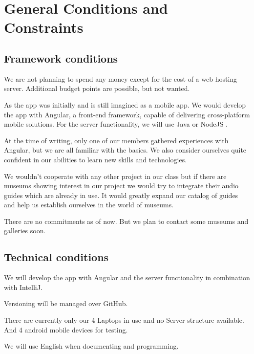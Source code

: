 \documentclass[12pt]{article}
\theoremstyle{definition}
\newenvironment{text}{
}{}
\begin{document}
\pagebreak
 
\section{General Conditions and Constraints}

\subsection{Framework conditions} 
\begin{text}

We are not planning to spend any money except for the cost of a web hosting server. Additional budget points are possible, but not wanted.\newline

As the app was initially and is still imagined as a mobile app. We would develop the app with Angular, a front-end framework, capable of delivering cross-platform mobile solutions. For the server functionality, we will use Java or NodeJS .\newline
 
At the time of writing, only one of our members gathered experiences with Angular, but we are all familiar with the basics.
We also consider ourselves quite confident in our abilities to learn new skills and technologies.\newline
 
We wouldn't cooperate with any other project in our class but if there are museums showing interest in our project we would try to integrate their audio guides
which are already in use. It would greatly expand our catalog of guides and help us establish ourselves in the world of museums.\newline
 
There are no commitments as of now. But we plan to contact some museums and galleries soon.

\end{text}

\subsection{Technical conditions}
\begin{text}

We will develop the app with Angular and the server functionality in combination with IntelliJ.

Versioning will be managed over GitHub.\newline
 
There are currently only our 4 Laptops in use and no Server structure available. And 4 android mobile devices for testing.\newline
 
We will use English when documenting and programming.

\end{text}
  
\end{document}
